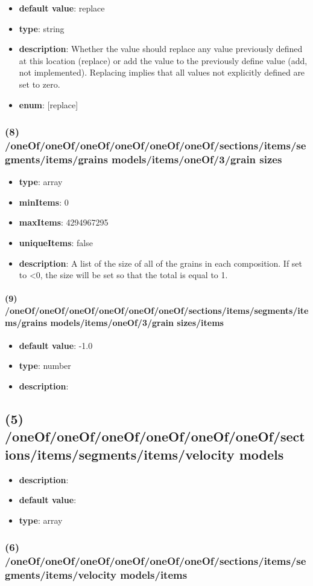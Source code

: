 \begin{itemize}[leftmargin=8em]\item {\bf default value}: replace
\item {\bf type}: string
\item {\bf description}: Whether the value should replace any value previously defined at this location (replace) or add the value to the previously define value (add, not implemented). Replacing implies that all values not explicitly defined are set to zero.
\item {\bf enum}: [replace]\end{itemize}\subsubsection{(8) /oneOf/oneOf/oneOf/oneOf/oneOf/oneOf/sections/items/segments/items/grains models/items/oneOf/3/grain sizes}
\begin{itemize}[leftmargin=8em]\item {\bf type}: array
\item {\bf minItems}: 0
\item {\bf maxItems}: 4294967295
\item {\bf uniqueItems}: false
\item {\bf description}: A list of the size of all of the grains in each composition. If set to <0, the size will be set so that the total is equal to 1.
\end{itemize}\paragraph{(9) /oneOf/oneOf/oneOf/oneOf/oneOf/oneOf/sections/items/segments/items/grains models/items/oneOf/3/grain sizes/items}
\begin{itemize}[leftmargin=9em]\item {\bf default value}: -1.0
\item {\bf type}: number
\item {\bf description}: 
\end{itemize}\subsection{(5) /oneOf/oneOf/oneOf/oneOf/oneOf/oneOf/sections/items/segments/items/velocity models}
\begin{itemize}[leftmargin=5em]\item {\bf description}: 
\item {\bf default value}: 
\item {\bf type}: array
\end{itemize}\subsubsection{(6) /oneOf/oneOf/oneOf/oneOf/oneOf/oneOf/sections/items/segments/items/velocity models/items}

